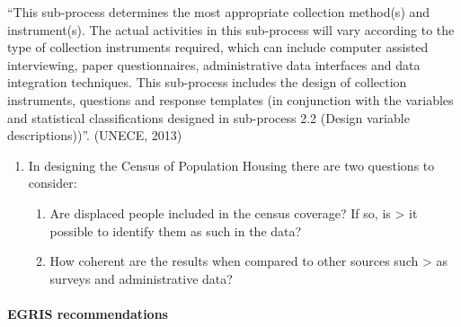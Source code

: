 \documentclass[
]{article}
\begin{document}
``This sub-process determines the most appropriate collection method(s)
and instrument(s). The actual activities in this sub-process will vary
according to the type of collection instruments required, which can
include computer assisted interviewing, paper questionnaires,
administrative data interfaces and data integration techniques. This
sub-process includes the design of collection instruments, questions and
response templates (in conjunction with the variables and statistical
classifications designed in sub-process 2.2 (Design variable
descriptions))''. (UNECE, 2013)

\begin{enumerate}
\def\labelenumi{\arabic{enumi}.}
\setcounter{enumi}{87}
\item
  In designing the Census of Population Housing there are two
  questions to consider:

  \begin{enumerate}
  \def\labelenumii{\arabic{enumii}.}
  \setcounter{enumii}{8}
  \item
    Are displaced people included in the census coverage? If so, is
    \textgreater{} it possible to identify them as such in the data?
  \item
    How coherent are the results when compared to other sources such
    \textgreater{} as surveys and administrative data?
  \end{enumerate}
\end{enumerate}

\hypertarget{a.1.-egris-recommendations}{%
\paragraph{EGRIS recommendations}\label{a.1.-egris-recommendations}}
\end{document}
